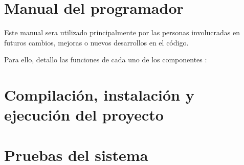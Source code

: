   
  

\section{Manual del programador}

Este manual sera utilizado principalmente por las personas involucradas en futuros cambios, mejoras o nuevos desarrollos en el código.

Para ello, detallo las funciones de cada uno de los componentes :


\section{Compilación, instalación y ejecución del proyecto}

\section{Pruebas del sistema}
